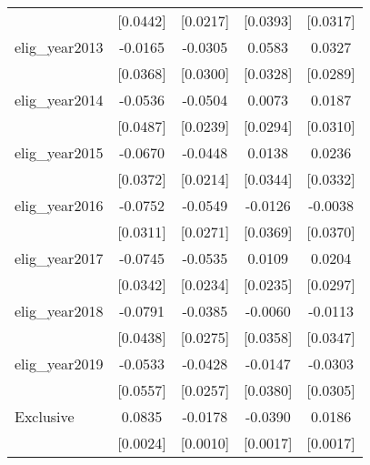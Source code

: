 \begin{table}[htbp]
\begin{tabular}{l*{4}{c}}
                    &    [0.0442]         &    [0.0217]         &    [0.0393]         &    [0.0317]         \\
\addlinespace
elig\_year2013       &     -0.0165         &     -0.0305         &      0.0583\sym{*}  &      0.0327         \\
                    &    [0.0368]         &    [0.0300]         &    [0.0328]         &    [0.0289]         \\
\addlinespace
elig\_year2014       &     -0.0536         &     -0.0504\sym{**} &      0.0073         &      0.0187         \\
                    &    [0.0487]         &    [0.0239]         &    [0.0294]         &    [0.0310]         \\
\addlinespace
elig\_year2015       &     -0.0670\sym{*}  &     -0.0448\sym{**} &      0.0138         &      0.0236         \\
                    &    [0.0372]         &    [0.0214]         &    [0.0344]         &    [0.0332]         \\
\addlinespace
elig\_year2016       &     -0.0752\sym{**} &     -0.0549\sym{**} &     -0.0126         &     -0.0038         \\
                    &    [0.0311]         &    [0.0271]         &    [0.0369]         &    [0.0370]         \\
\addlinespace
elig\_year2017       &     -0.0745\sym{**} &     -0.0535\sym{**} &      0.0109         &      0.0204         \\
                    &    [0.0342]         &    [0.0234]         &    [0.0235]         &    [0.0297]         \\
\addlinespace
elig\_year2018       &     -0.0791\sym{*}  &     -0.0385         &     -0.0060         &     -0.0113         \\
                    &    [0.0438]         &    [0.0275]         &    [0.0358]         &    [0.0347]         \\
\addlinespace
elig\_year2019       &     -0.0533         &     -0.0428         &     -0.0147         &     -0.0303         \\
                    &    [0.0557]         &    [0.0257]         &    [0.0380]         &    [0.0305]         \\
\addlinespace
Exclusive           &      0.0835\sym{***}&     -0.0178\sym{***}&     -0.0390\sym{***}&      0.0186\sym{***}\\
                    &    [0.0024]         &    [0.0010]         &    [0.0017]         &    [0.0017]         \\

\end{tabular}
\end{table}
